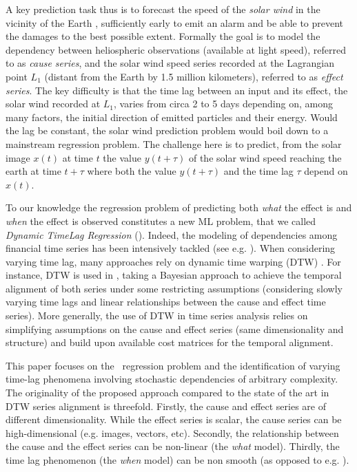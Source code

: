 A key prediction task thus is to forecast the speed of the \emph{solar wind} in the vicinity of the Earth 
\citep{doi:10.1002/jgra.50429,doi:10.1029/2009SW000542}, sufficiently early to emit an alarm and be able to prevent 
the damages to the best possible extent. Formally the goal is to model the dependency between heliospheric 
observations (available at light speed), referred to as {\em cause series}, and the solar wind speed series 
recorded at the Lagrangian point $L_1$ (distant from the Earth by 1.5 million kilometers), referred to as 
{\em effect series}. The key difficulty is that the time lag between an input and its effect, the solar wind 
recorded at $L_1$, varies from circa 2 to 5 days depending on, among many factors, the initial direction of 
emitted particles and their energy. Would the lag be constant, the solar wind prediction problem would boil 
down to a mainstream regression problem. The challenge here is to predict, from the solar image $x(t)$ at 
time $t$ the value $y(t+\tau)$ of the solar wind speed reaching the earth at time $t+\tau$ where both the 
value $y(t+\tau)$ and the time lag $\tau$ depend on $x(t)$.

To our knowledge the regression problem of predicting both {\em what} the effect is and {\em when} the effect 
is observed constitutes a new ML problem, that we called {\em Dynamic TimeLag Regression} (\XX). Indeed, the 
modeling of dependencies among financial time series has been intensively tackled (see e.g. \citet{ZHOU2006195}). 
When considering varying time lag, many approaches rely on dynamic time warping (DTW) \citep{SakoeShiba1978}. 
For instance, DTW is used in \citet{SignalDiffusion}, taking a Bayesian approach to achieve the temporal alignment 
of both series under some restricting assumptions (considering slowly varying time lags and linear relationships 
between the cause and effect time series). More generally, the use of DTW in time series analysis relies on 
simplifying assumptions on the cause and effect series (same dimensionality and structure) and build upon 
available cost matrices for the temporal alignment. 

This paper focuses on the \XX\ regression problem and the identification of varying time-lag phenomena involving 
stochastic dependencies of arbitrary complexity. The originality of the proposed approach compared to the state of 
the art in DTW series alignment is threefold. Firstly, the cause and effect series are of different dimensionality. 
While the effect series is scalar, the cause series can be high-dimensional (e.g. images, vectors, etc). 
Secondly, the relationship between the cause and the effect series can be non-linear (the {\em what} model). 
Thirdly, the time lag phenomenon (the {\em when} model) can be non smooth (as opposed to e.g. \citet{ZHOU2006195}).

